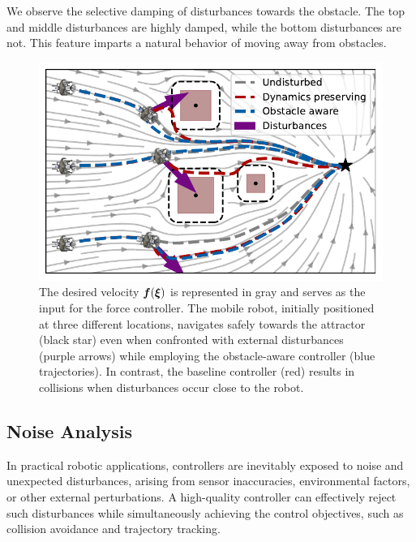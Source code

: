 We observe the selective damping of disturbances towards the obstacle. The top and middle disturbances are highly damped, while the bottom disturbances are not. This feature imparts a natural behavior of moving away from obstacles.

\begin{figure}
  \centering
  \centerline{\includegraphics[width=0.95\columnwidth]{figures/multi_obstacle_with_damping.pdf}}
  \caption{
  The desired velocity $\boldsymbol{f}(\boldsymbol{\xi})$ is represented in gray and serves as the input for the force controller. The mobile robot, initially positioned at three different locations, navigates safely towards the attractor (black star) even when confronted with external disturbances (purple arrows) while employing the obstacle-aware controller (blue trajectories). In contrast, the baseline controller (red) results in collisions when disturbances occur close to the robot.
  }
  \label{fig:obstacle_aware_damping_comparison}
\end{figure}

\subsection{Noise Analysis}
In practical robotic applications, controllers are inevitably exposed to noise and unexpected disturbances, arising from sensor inaccuracies, environmental factors, or other external perturbations. A high-quality controller can effectively reject such disturbances while simultaneously achieving the control objectives, such as collision avoidance and trajectory tracking.

